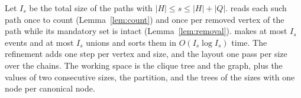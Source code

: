 Let $I_s$ be the total size of the paths with $|H|\le s\le|H|+|Q|$.
%
 reads each such path once to count (Lemma~\ref{lem:count}) and once per removed vertex of the path while its mandatory set is intact (Lemma~\ref{lem:removal}).
%
 makes at most $I_s$ events and at most $I_s$ unions and sorts them in $O(I_s\log I_s)$ time.
%
The refinement adds one step per vertex and size, and the layout one pass per size over the chains.
%
The working space is the clique tree and the graph, plus the values of two consecutive sizes, the partition, and the trees of the sizes with one node per canonical node.
